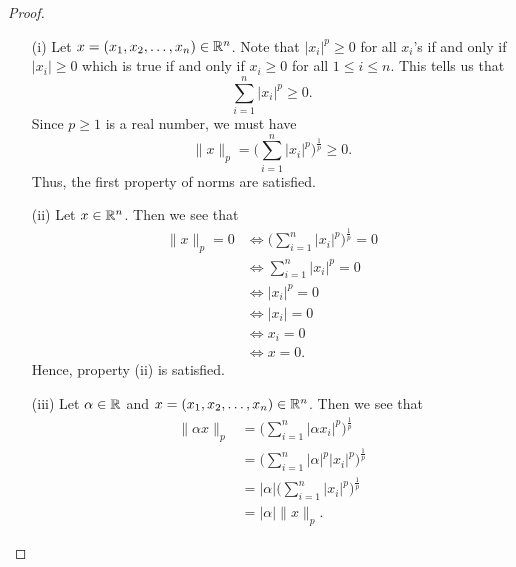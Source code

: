 \documentclass{article}
\begin{document}
\begin{enumerate}
\begin{proof}
        \begin{enumerate}
            \item[(i)] Let \( x = ({x}_{1}, {x}_{2}, \dots, {x}_{n}) \in \mathbb{R}^{n} \). Note that \( | {x}_{i} |^{p} \geq 0    \) for all \( {x}_{i} \)'s if and only if \( | {x}_{i}| \geq 0    \) which is true if and only if \( {x}_{i} \geq 0   \) for all \( 1 \leq i \leq n  \). This tells us that     
                \[  \sum_{ i=1  }^{ n } | {x}_{i} |^{p}  \geq 0.  \]
                Since \( p \geq 1  \) is a real number, we must have
                \[  \|x\|_p  = \Big( \sum_{ i=1 }^{ n } | {x}_{i} |^{p}   \Big)^{\frac{ 1 }{ p } } \geq 0. \]
                Thus, the first property of norms are satisfied.
            \item[(ii)] Let \( x \in \mathbb{R}^{n} \). Then we see that 
                \begin{align*}
                    \|x\|_p = 0  &\Longleftrightarrow \Big(  \sum_{ i=1  }^{ n } | {x}_{i} |^{p}  \Big)^{\frac{ 1 }{ p } } =  0 \\
                                 &\Longleftrightarrow \sum_{ i=1  }^{ n } | {x}_{i} |^{p}  = 0  \\
                                 &\Longleftrightarrow | {x}_{i} |^{p} = 0 \tag {  \( \forall \  1 \leq i \leq n \) }   \\
                                 &\Longleftrightarrow | {x}_{i} |  = 0 \tag{  \( \forall \  1 \leq i \leq n \) }\\
                                 &\Longleftrightarrow {x}_{i} = 0  \tag{  \( \forall \  1 \leq i \leq n \) } \\
                                 &\Longleftrightarrow x = 0.
                \end{align*}
                Hence, property (ii) is satisfied.
            \item[(iii)] Let \( \alpha \in \mathbb{R}  \) and \( x = ({x}_{1}, {x}_{2}, \dots, {x}_{n}) \in \mathbb{R}^{n} \). Then we see that  
                \begin{align*}
                    \| \alpha x \|_p &= \Big(  \sum_{ i=1  }^{ n } | \alpha {x}_{i} |^{p} \Big)^{\frac{ 1 }{ p } } \\
                                   &= \Big(  \sum_{ i=1  }^{ n } | \alpha |^{p} | {x}_{i} |^{p}  \Big)^{\frac{ 1 }{ p } } \\
                                   &=  | \alpha | \Big(  \sum_{ i=1  }^{ n } | {x}_{i} |^{p} \Big)^{\frac{ 1 }{ p } } \\
                                   &= | \alpha | \|x\|_p.

\end{align*}
\end{enumerate}
\end{proof}
\end{enumerate}
\end{document}
